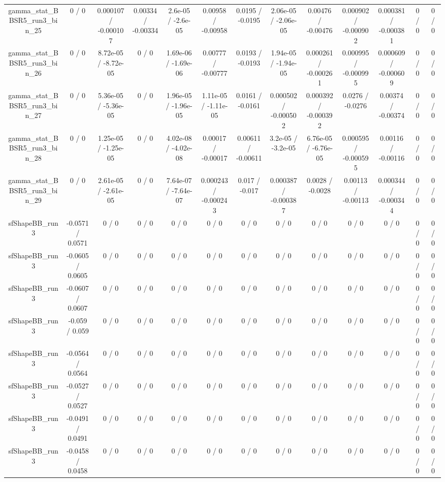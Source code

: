 \documentclass[10pt]{article}
\begin{document}
\begin{table}[htbp]
\begin{center}
\begin{tabular}{|c|c|c|c|c|c|c|c|c|c|c|c|c|}
  gamma_stat_BBSR5_run3_bin_25 & 0 / 0 & 0.000107 / -0.000107 & 0.00334 / -0.00334 & 2.6e-05 / -2.6e-05 & 0.00958 / -0.00958 & 0.0195 / -0.0195 & 2.06e-05 / -2.06e-05 & 0.00476 / -0.00476 & 0.000902 / -0.000902 & 0.000381 / -0.000381 & 0 / 0 & 0 / 0 \\ 
  gamma_stat_BBSR5_run3_bin_26 & 0 / 0 & 8.72e-05 / -8.72e-05 & 0 / 0 & 1.69e-06 / -1.69e-06 & 0.00777 / -0.00777 & 0.0193 / -0.0193 & 1.94e-05 / -1.94e-05 & 0.000261 / -0.000261 & 0.000995 / -0.000995 & 0.000609 / -0.000609 & 0 / 0 & 0 / 0 \\ 
  gamma_stat_BBSR5_run3_bin_27 & 0 / 0 & 5.36e-05 / -5.36e-05 & 0 / 0 & 1.96e-05 / -1.96e-05 & 1.11e-05 / -1.11e-05 & 0.0161 / -0.0161 & 0.000502 / -0.000502 & 0.000392 / -0.000392 & 0.0276 / -0.0276 & 0.00374 / -0.00374 & 0 / 0 & 0 / 0 \\ 
  gamma_stat_BBSR5_run3_bin_28 & 0 / 0 & 1.25e-05 / -1.25e-05 & 0 / 0 & 4.02e-08 / -4.02e-08 & 0.00017 / -0.00017 & 0.00611 / -0.00611 & 3.2e-05 / -3.2e-05 & 6.76e-05 / -6.76e-05 & 0.000595 / -0.000595 & 0.00116 / -0.00116 & 0 / 0 & 0 / 0 \\ 
  gamma_stat_BBSR5_run3_bin_29 & 0 / 0 & 2.61e-05 / -2.61e-05 & 0 / 0 & 7.64e-07 / -7.64e-07 & 0.000243 / -0.000243 & 0.017 / -0.017 & 0.000387 / -0.000387 & 0.0028 / -0.0028 & 0.00113 / -0.00113 & 0.000344 / -0.000344 & 0 / 0 & 0 / 0 \\ 
  sfShapeBB_run3 & -0.0571 / 0.0571 & 0 / 0 & 0 / 0 & 0 / 0 & 0 / 0 & 0 / 0 & 0 / 0 & 0 / 0 & 0 / 0 & 0 / 0 & 0 / 0 & 0 / 0 \\ 
  sfShapeBB_run3 & -0.0605 / 0.0605 & 0 / 0 & 0 / 0 & 0 / 0 & 0 / 0 & 0 / 0 & 0 / 0 & 0 / 0 & 0 / 0 & 0 / 0 & 0 / 0 & 0 / 0 \\ 
  sfShapeBB_run3 & -0.0607 / 0.0607 & 0 / 0 & 0 / 0 & 0 / 0 & 0 / 0 & 0 / 0 & 0 / 0 & 0 / 0 & 0 / 0 & 0 / 0 & 0 / 0 & 0 / 0 \\ 
  sfShapeBB_run3 & -0.059 / 0.059 & 0 / 0 & 0 / 0 & 0 / 0 & 0 / 0 & 0 / 0 & 0 / 0 & 0 / 0 & 0 / 0 & 0 / 0 & 0 / 0 & 0 / 0 \\ 
  sfShapeBB_run3 & -0.0564 / 0.0564 & 0 / 0 & 0 / 0 & 0 / 0 & 0 / 0 & 0 / 0 & 0 / 0 & 0 / 0 & 0 / 0 & 0 / 0 & 0 / 0 & 0 / 0 \\ 
  sfShapeBB_run3 & -0.0527 / 0.0527 & 0 / 0 & 0 / 0 & 0 / 0 & 0 / 0 & 0 / 0 & 0 / 0 & 0 / 0 & 0 / 0 & 0 / 0 & 0 / 0 & 0 / 0 \\ 
  sfShapeBB_run3 & -0.0491 / 0.0491 & 0 / 0 & 0 / 0 & 0 / 0 & 0 / 0 & 0 / 0 & 0 / 0 & 0 / 0 & 0 / 0 & 0 / 0 & 0 / 0 & 0 / 0 \\ 
  sfShapeBB_run3 & -0.0458 / 0.0458 & 0 / 0 & 0 / 0 & 0 / 0 & 0 / 0 & 0 / 0 & 0 / 0 & 0 / 0 & 0 / 0 & 0 / 0 & 0 / 0 & 0 / 0 \\ 

\end{tabular}
\end{center}
\end{table}
\end{document}
